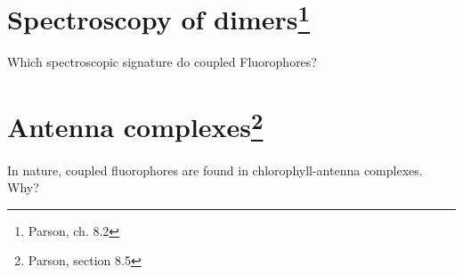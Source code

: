 \section{Spectroscopy of dimers\protect\footnote{Parson, ch. 8.2}} 

Which spectroscopic signature do coupled
Fluorophores?

\section{Antenna complexes\protect\footnote{Parson, section 8.5}} 

In nature, coupled fluorophores are found in
chlorophyll-antenna complexes. Why?




\printbibliography[segment=\therefsegment,heading=subbibliography]
